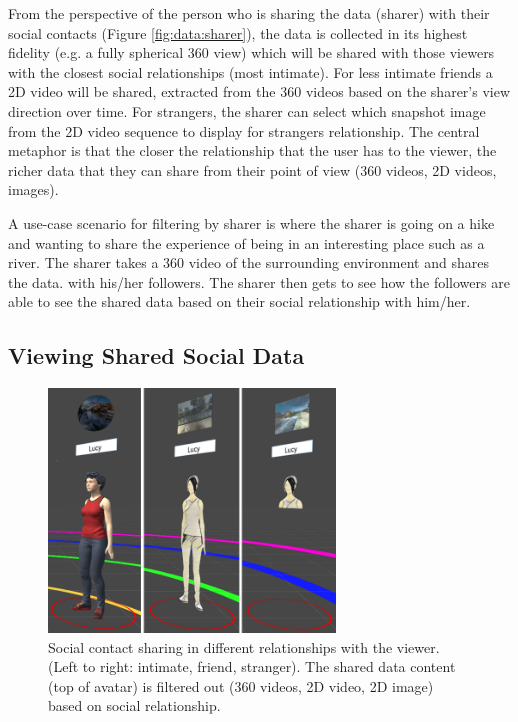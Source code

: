 From the perspective of the person who is sharing the data (sharer) with their social contacts (Figure \ref{fig:data:sharer}), the data is collected in its highest fidelity (e.g. a fully spherical 360 view) which will be shared with those viewers with the closest social relationships (most intimate). For less intimate friends a 2D video will be shared, extracted from the 360 videos based on the sharer's view direction over time. For strangers, the sharer can select which snapshot image from the 2D video sequence to display for strangers relationship. The central metaphor is that the closer the relationship that the user has to the viewer, the richer data that they can share from their point of view (360 videos, 2D videos, images).

A use-case scenario for filtering by sharer is where the sharer is going on a hike and wanting to share the experience of being in an interesting place such as a river. The sharer takes a 360 video of the surrounding environment and shares the data. with his/her followers. The sharer then gets to see how the followers are able to see the shared data based on their social relationship with him/her.

\subsection{Viewing Shared Social Data}

\begin{figure}[ht]
    \centering
    \includegraphics[width=3in]{images/chi/3_levels_of_data.png}
    \caption{Social contact sharing in different relationships with the viewer. (Left to right: intimate, friend, stranger). The shared data content (top of avatar) is filtered out (360 videos, 2D video, 2D image) based on social relationship.}
      \label{fig:data:viewer}
\end{figure}

